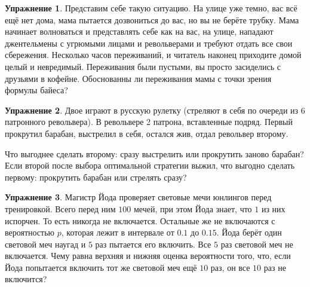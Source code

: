 \documentclass[12pt, a4paper, oneside]{extreport}
\theoremstyle{plain}              %
\theoremstyle{definition}         %
\newtheorem{problem}{\color{myblue} Упражнение}
\begin{document}
\begin{problem}
Представим себе такую ситуацию. На улице уже темно, вас всё ещё нет дома, мама пытается дозвониться до вас, но вы не берёте трубку.  Мама начинает волноваться и представлять себе как на вас, на улице, нападают джентельмены с угрюмыми лицами и револьверами и требуют отдать все свои сбережения.  Несколько часов переживаний, и читатель наконец приходите домой целый и невредимый. Переживания были пустыми, вы просто засиделись с друзьями в кофейне.  Обоснованны ли переживания мамы с точки зрения формулы байеса? 
\end{problem}


\begin{problem}
Двое играют в русскую рулетку (стреляют в себя по очереди из 6 патронного револьвера). В револьвере 2 патрона, вставленные подряд. Первый прокрутил барабан, выстрелил в себя, остался жив, отдал револьвер второму. 

Что выгоднее сделать второму: сразу выстрелить или прокрутить заново барабан? Если второй после выбора оптимальной стратегии выжил, что выгодно сделать первому: прокрутить барабан или стрелять сразу?
\end{problem}


\begin{problem}
Магистр Йода проверяет световые мечи юнлингов перед тренировкой. Всего перед ним $100$ мечей, при этом Йода знает, что $1$ из них испорчен. То есть никогда не включается. Остальные же не включаются с вероятностью $p$, которая лежит в интервале от $0.1$ до $0.15$. Йода берёт один световой меч наугад и $5$ раз пытается его включить. Все $5$ раз световой меч не включается. Чему равна верхняя и нижняя оценка вероятности того, что, если Йода попытается включить тот же световой меч ещё $10$ раз, он все $10$ раз не включится?
\end{problem}
\end{document}
